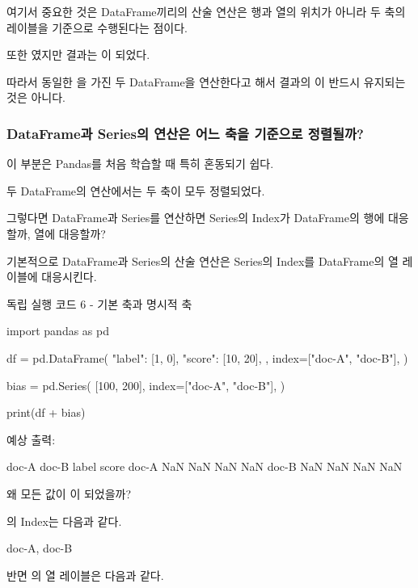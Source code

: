 여기서 중요한 것은 DataFrame끼리의 산술 연산은 행과 열의 위치가 아니라 두 축의 레이블을 기준으로 수행된다는 점이다.

또한 였지만 결과는 이 되었다.

따라서 동일한 을 가진 두 DataFrame을 연산한다고 해서 결과의 이 반드시 유지되는 것은 아니다.

\subsubsection{DataFrame과 Series의 연산은 어느 축을 기준으로 정렬될까?}

이 부분은 Pandas를 처음 학습할 때 특히 혼동되기 쉽다.

두 DataFrame의 연산에서는 두 축이 모두 정렬되었다.

그렇다면 DataFrame과 Series를 연산하면 Series의 Index가 DataFrame의 행에 대응할까, 열에 대응할까?

기본적으로 DataFrame과 Series의 산술 연산은 Series의 Index를 DataFrame의 열 레이블에 대응시킨다.

\begin{dhknote}
\begin{dhksmry}[centered]
독립 실행 코드 6 - 기본 축과 명시적 축
\end{dhksmry}
\end{dhknote}

\begin{dhkcode}
import pandas as pd

df = pd.DataFrame(
    {
        "label": [1, 0],
        "score": [10, 20],
    },
    index=["doc-A", "doc-B"],
)

bias = pd.Series(
    [100, 200],
    index=["doc-A", "doc-B"],
)

print(df + bias)
\end{dhkcode}

예상 출력:

\begin{dhkzsh}
       doc-A  doc-B  label  score
doc-A    NaN    NaN    NaN    NaN
doc-B    NaN    NaN    NaN    NaN
\end{dhkzsh}

왜 모든 값이 이 되었을까?

의 Index는 다음과 같다.

\begin{dhkzsh}
doc-A, doc-B
\end{dhkzsh}

반면 의 열 레이블은 다음과 같다.

